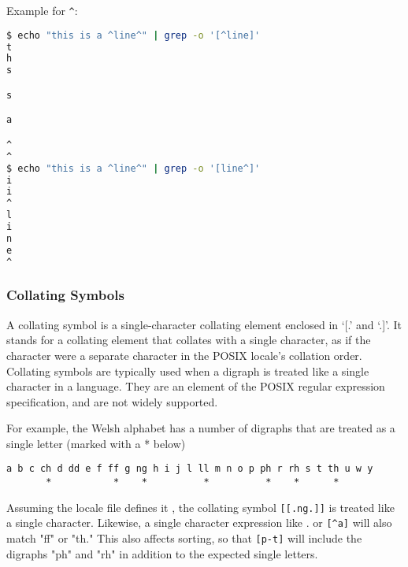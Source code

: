 Example for \lstinline|^|:
\begin{lstlisting}[language=bash]
$ echo "this is a ^line^" | grep -o '[^line]'
t
h
s

s

a

^
^
$ echo "this is a ^line^" | grep -o '[line^]'
i
i
^
l
i
n
e
^
\end{lstlisting}

\subsubsection{Collating Symbols}

A collating symbol is a single-character collating element enclosed in ‘[.’ and ‘.]’. It stands for a collating element that collates with a single character, as if the character were a separate character in the POSIX locale’s collation order.
Collating symbols are typically used when a digraph is treated like a single character in a language. They are an element of the POSIX regular expression specification, and are not widely supported.

For example, the Welsh alphabet
has a number of digraphs that are treated as a single letter (marked with a * below)

\begin{lstlisting}
a b c ch d dd e f ff g ng h i j l ll m n o p ph r rh s t th u w y
       *           *    *          *          *    *      *
\end{lstlisting}

Assuming the locale file defines it
, the collating symbol
\lstinline|[[.ng.]]|
is treated like a single character. Likewise, a single character expression like . or
\lstinline|[^a]|
will also match "ff" or "th." This also affects sorting, so that
\lstinline|[p-t]|
will include the digraphs "ph" and "rh" in addition to the expected single letters.

